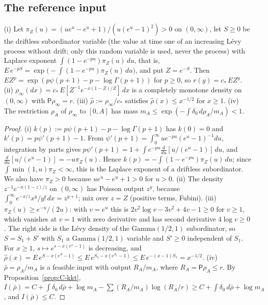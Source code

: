 \subsection{The reference input}\label{app:C-ref-sec}

\begin{lemma}\label{lem:C-ref}
(i) Let $\pi_Z(u)=(ue^u-e^u+1)/(u(e^u-1)^2)>0$ on $(0,\infty)$, let $S\ge0$ be the driftless subordinator variable (the value at time one of an increasing L\'evy process without drift; only this random variable is used, never the process) with Laplace
exponent $\int(1-e^{-pu})\pi_Z(u)\,du$, that is, $E\,e^{-pS}=\exp\bigl(-\int(1-e^{-pu})\pi_Z(u)\,du\bigr)$, and put $Z=e^{-S}$. Then $EZ^p=\exp(p\psi(p+1)-p-\log\Gamma(p+1))$ for $p\ge0$, so
$r(y)=c_*\,EZ^y$.
(ii) $\rho_\infty(dx)=c_*\,E[Z^{-1}e^{-x(1-Z)/Z}]\,dx$ is a completely monotone density on $(0,\infty)$ with $\mathsf P\rho_\infty=r$.
(iii) $\hat\rho:=\rho_\infty/c_*$ satisfies $\hat\rho(x)\le x^{-1/2}$ for $x\ge1$.
(iv) The restriction $\rho_A$ of $\rho_\infty$ to $[0,A]$ has mass $m_A\le\exp(-\int\delta_0\,d\rho_A/m_A)<1$.
\end{lemma}
\begin{proof}
(i) $k(p):=p\psi(p+1)-p-\log\Gamma(p+1)$ has $k(0)=0$ and $k'(p)=p\psi'(p+1)-1$. From
$\psi'(p+1)=\int_0^\infty ue^{-pu}(e^u-1)^{-1}du$, integration by parts gives $p\psi'(p+1)=1+\int e^{-pu}\frac{d}{du}[u/(e^u-1)]\,du$, and
$\frac{d}{du}[u/(e^u-1)]=-u\pi_Z(u)$. Hence $k(p)=-\int(1-e^{-pu})\pi_Z(u)\,du$; since $\int\min(1,u)\pi_Z<\infty$, this is the Laplace
exponent of a driftless subordinator. We also have $\pi_Z>0$ because $ue^u-e^u+1>0$ for $u>0$.
(ii) The density $z^{-1}e^{-x(1-z)/z}$ on $(0,\infty)$ has Poisson output $z^y$, because $\int_0^\infty e^{-x/z}x^y/y!\,dx=z^{y+1}$;
mix over $z=Z$ (positive terms, Fubini).
(iii) $\pi_Z(u)\ge e^{-u}/(2u)$: with $v=e^u$ this is $2v^2\log v-3v^2+4v-1\ge0$ for $v\ge1$, which vanishes at $v=1$ with zero
derivative and has second derivative $4\log v\ge0$. The right side is the L\'evy density of the $\mathrm{Gamma}(1/2,1)$ subordinator,
so $S=S_1+S'$ with $S_1$ a $\mathrm{Gamma}(1/2,1)$ variable and $S'\ge0$ independent of $S_1$. For $x\ge1$, $s\mapsto e^{s-x(e^s-1)}$ is decreasing, and
$\hat\rho(x)=E\,e^{S-x(e^S-1)}\le E\,e^{S_1-x(e^{S_1}-1)}\le E\,e^{-(x-1)S_1}=x^{-1/2}$.
(iv) $\bar\rho=\rho_A/m_A$ is a feasible input with output $R_A/m_A$, where $R_A=\mathsf P\rho_A\le r$. By Proposition~\ref{prop:C-kkt},
$I(\bar\rho)=C+\int\delta_0\,d\bar\rho+\log m_A-\sum(R_A/m_A)\log(R_A/r)\ge C+\int\delta_0\,d\bar\rho+\log m_A$, and $I(\bar\rho)\le C$.
\end{proof}

